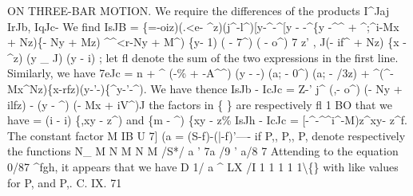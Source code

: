 \documentclass[12pt,a4paper]{article}
\begin{document}
ON THREE-BAR MOTION.
We require the
differences of the products I\textasciicircum{}Jaj IrJb, IqJc-
We
find
IsJB = \{\guillemotright{}=-oiz)(.<e- \textasciicircum{}z)(j\textasciicircum{}-l\textasciicircum{})[y-\textasciicircum{}-\textasciicircum{}[y - -\textasciicircum{}\{y -\textasciicircum{}\textasciicircum{} + \textasciicircum{};\textasciicircum{}i-Mx + Nz)\{- Ny + Mz)
\textasciicircum{}\textasciicircum{}<r-Ny + M\textasciicircum{}) \{y- 1) (\guillemotleft{} - 7\textasciicircum{}) (\guillemotleft{} - o\textasciicircum{})
7\guillemotleft{}
z'
, J(-
i\guillemotright{}f\textasciicircum{} + Nz) \{x - \textasciicircum{}z) (y \_
J) (y - i)
;
let
fl denote the sum of the two expressions
in the
first
line.
Similarly, we have
7eJc = n + \textasciicircum{} (-\% + -A\textasciicircum{}\textasciicircum{}) (y -
-)
(a; - 0\textasciicircum{}) (a; - /3z)
+ \textasciicircum{}(\textasciicircum{}-Mx\textasciicircum{}Nz)\{x-rfz)(y-'-)\{\textasciicircum{}y-'-\textasciicircum{}).
We have thence
IsJb - IcJc = Z-' j\textasciicircum{} (\guillemotright{},- o\textasciicircum{}) (- Ny + ilfz) - (y - \textasciicircum{}) (- Mx + iV\textasciicircum{})J
the
factors
in
\{
\} are respectively
fl
1
BO that we have
= (i - i) \{,xy - z\textasciicircum{}) and \{m - \textasciicircum{}) \{xy - z\%
IsJh - IcJc = [-\textasciicircum{}-\textasciicircum{}\textasciicircum{}i\textasciicircum{}-M)z\textasciicircum{}xy- z\textasciicircum{}f.
The constant
factor
M
IB
U
7] (a
= (S-f)-(|-f)'----
if P,, P,, P, denote respectively the functions
N\_
M
N
M
N
M
/S*/
a
'
7a
/9
'
a/8
7
Attending to the equation 0/87 \textasciicircum{}fgh,
it appears that we have
D
1/
a
\textasciicircum{}
LX
/I
1
1
1
1
1\textbackslash\{\}
with
like
values
for P, and
P,.
C.
IX.
71
\end{document}
